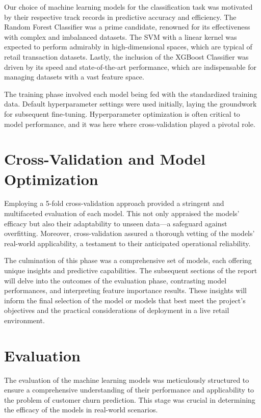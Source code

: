 \documentclass[12pt]{article}
\begin{document}
\medskip
Our choice of machine learning models for the classification task was motivated by their respective track records in predictive accuracy and efficiency. The Random Forest Classifier was a prime candidate, renowned for its effectiveness with complex and imbalanced datasets. The SVM with a linear kernel was expected to perform admirably in high-dimensional spaces, which are typical of retail transaction datasets. Lastly, the inclusion of the XGBoost Classifier was driven by its speed and state-of-the-art performance, which are indispensable for managing datasets with a vast feature space.

\medskip
The training phase involved each model being fed with the standardized training data. Default hyperparameter settings were used initially, laying the groundwork for subsequent fine-tuning. Hyperparameter optimization is often critical to model performance, and it was here where cross-validation played a pivotal role.

\section*{Cross-Validation and Model Optimization}
Employing a 5-fold cross-validation approach provided a stringent and multifaceted evaluation of each model. This not only appraised the models' efficacy but also their adaptability to unseen data—a safeguard against overfitting. Moreover, cross-validation assured a thorough vetting of the models' real-world applicability, a testament to their anticipated operational reliability.

\medskip
The culmination of this phase was a comprehensive set of models, each offering unique insights and predictive capabilities. The subsequent sections of the report will delve into the outcomes of the evaluation phase, contrasting model performances, and interpreting feature importance results. These insights will inform the final selection of the model or models that best meet the project's objectives and the practical considerations of deployment in a live retail environment.

\section*{Evaluation}
The evaluation of the machine learning models was meticulously structured to ensure a comprehensive understanding of their performance and applicability to the problem of customer churn prediction. This stage was crucial in determining the efficacy of the models in real-world scenarios.
\end{document}
